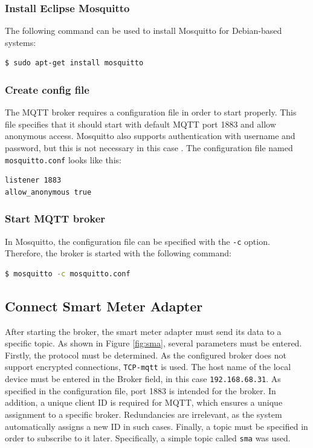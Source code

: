 \subsubsection{Install Eclipse Mosquitto} The following command can be used to install Mosquitto for Debian-based systems:

\begin{lstlisting}[language=bash]
$ sudo apt-get install mosquitto
\end{lstlisting}

\subsubsection{Create config file} The MQTT broker requires a configuration file in order to start properly. This file specifies that it should start with default MQTT port 1883 and allow anonymous access. Mosquitto also supports authentication with username and password, but this is not necessary in this case \cite{mosquitto}. The configuration file named \lstinline{mosquitto.conf} looks like this:

\begin{lstlisting}
listener 1883
allow_anonymous true
\end{lstlisting}

\subsubsection{Start MQTT broker} In Mosquitto, the configuration file can be specified with the \lstinline{-c} option. Therefore, the broker is started with the following command:

\begin{lstlisting}[language=bash]
$ mosquitto -c mosquitto.conf
\end{lstlisting}

\subsection{Connect Smart Meter Adapter}

After starting the broker, the smart meter adapter must send its data to a specific topic. As shown in Figure \ref{fig:sma}, several parameters must be entered. Firstly, the protocol must be determined. As the configured broker does not support encrypted connections, \lstinline{TCP-mqtt} is used. The host name of the local device must be entered in the Broker field, in this case \lstinline{192.168.68.31}. As specified in the configuration file, port 1883 is intended for the broker. In addition, a unique client ID is required for MQTT, which ensures a unique assignment to a specific broker. Redundancies are irrelevant, as the system automatically assigns a new ID in such cases. Finally, a topic must be specified in order to subscribe to it later. Specifically, a simple topic called \lstinline{sma} was used.

